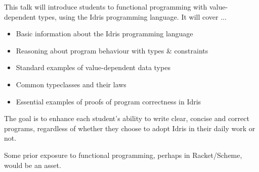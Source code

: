 This talk will introduce students to functional programming
with value-dependent types, using the Idris programming language.
It will cover ...

\begin{itemize}
\item Basic information about the Idris programming language
\item Reasoning about program behaviour with types & constraints
\item Standard examples of value-dependent data types
\item Common typeclasses and their laws
\item Essential examples of proofs of program correctness in Idris
\end{itemize}

The goal is to enhance each student's ability to write clear, concise
and correct programs, regardless of whether they choose to adopt Idris
in their daily work or not.

Some prior exposure to functional programming, perhaps in Racket/Scheme,
would be an asset.

